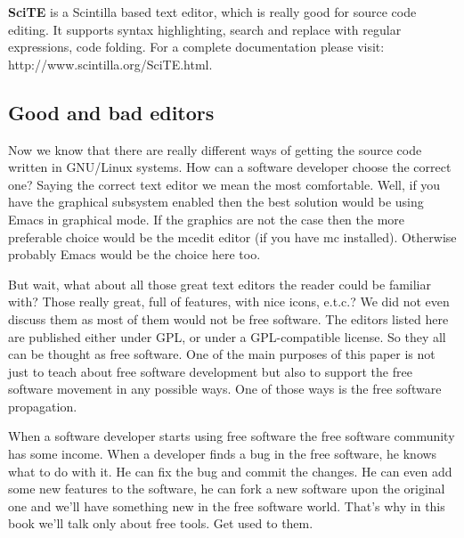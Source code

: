 \textbf{SciTE} is a Scintilla based text editor, which is really good for source code editing. It supports syntax highlighting, search and replace with regular expressions, code folding. For a complete documentation please visit: http://www.scintilla.org/SciTE.html.

\subsection{Good and bad editors}
Now we know that there are really different ways of getting the source code written in GNU/Linux systems. How can a software developer choose the correct one? Saying the correct text editor we mean the most comfortable. Well, if you have the graphical subsystem enabled then the best solution would be using Emacs in graphical mode. If the graphics are not the case then the more preferable choice would be the mcedit editor (if you have mc installed). Otherwise probably Emacs would be the choice here too.

But wait, what about all those great text editors the reader could be familiar with? Those really great, full of features, with nice icons, e.t.c.? We did not even discuss them as most of them would not be free software. The editors listed here are published either under GPL, or under a GPL-compatible license. So they all can be thought as free software. One of the main purposes of this paper is not just to teach about free software development but also to support the free software movement in any possible ways. One of those ways is the free software propagation.

When a software developer starts using free software the free software community has some income. When a developer finds a bug in the free software, he knows what to do with it. He can fix the bug and commit the changes. He can even add some new features to the software, he can fork a new software upon the original one and we'll have something new in the free software world. That's why in this book we'll talk only about free tools. Get used to them.
